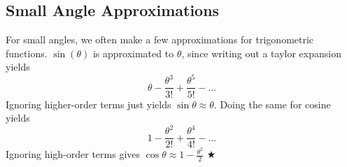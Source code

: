 \subsection{Small Angle Approximations} \label{A.2.3}
For small angles, we often make a few approximations for trigonometric functions. $\sin(\theta)$ is approximated to $\theta$, since writing out a taylor expansion yields
\begin{equation*}
    \theta - \frac{\theta^3}{3!} + \frac{\theta^5}{5!} -\ldots
\end{equation*}
\noindent Ignoring higher-order terms just yields $\sin \theta \approx \theta$. Doing the same for cosine yields
\begin{equation*}
    1 - \frac{\theta^2}{2!} + \frac{\theta^4}{4!} -\ldots
\end{equation*}
Ignoring high-order terms gives $\cos \theta \approx 1-\frac{\theta^2}{2}$ $\bigstar$